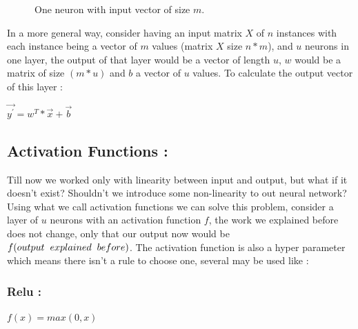 \documentclass[10pt,a4paper]{article}
\begin{document}
\begin{figure}[H]
\centering
{}
\caption{One neuron with input vector of size $ m $.}
\end{figure}


In a more general way, consider having an input matrix $ X $ of $ n $ instances with each instance being a vector of $ m $ values (matrix $ X $ size $ n*m $), and $ u $ neurons in one layer, the output of that layer would be a vector of length $ u $, $ w $ would be a matrix of size $ (m*u) $ and $ b $ a vector of $ u $ values. To calculate the output vector of this layer :\\
\begin{center}
$ \vec{y^{\prime}} = w^{T}*\vec{x} + \vec{b} $
\end{center}

\subsection{Activation Functions :}
Till now we worked only with linearity between input and output, but what if it doesn't exist? Shouldn't we introduce some non-linearity to out neural network? Using what we call activation functions we can solve this problem, consider a layer of $ u $ neurons with an activation function $ f $, the work we explained before does not change, only that our output now would be $ f(output \hspace{2mm} explained \hspace{2mm} before) $. The activation function is also a hyper parameter which means there isn't a rule to choose one, several may be used like :
\subsubsection{Relu :}
\begin{center}
$ f(x) = max(0,x) $
\end{center}
\end{document}
